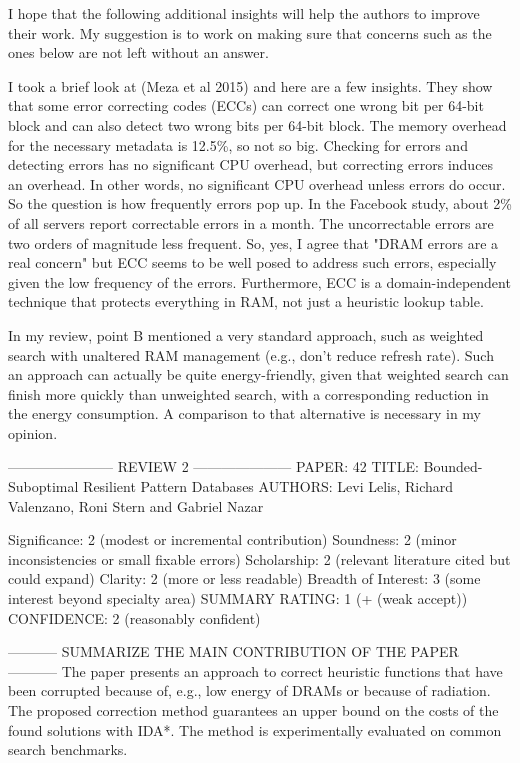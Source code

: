 I hope that the following additional insights will help the authors to improve their work. My suggestion is to work on making sure that concerns such as the ones below are not left without an answer.

I took a brief look at (Meza et al 2015) and here are a few insights. They show that some error correcting codes (ECCs) can correct one wrong bit per 64-bit block and can also detect two wrong bits per 64-bit block. The memory overhead for the necessary metadata is 12.5\%, so not so big. Checking for errors and detecting errors has no significant CPU overhead, but correcting errors induces an overhead. In other words, no significant CPU overhead unless errors do occur. So the question is how frequently errors pop up. In the Facebook study, about 2\% of all servers report correctable errors in a month. The uncorrectable errors are two orders of magnitude less frequent. So, yes, I agree that "DRAM errors are a real concern" but ECC seems to be well posed to address such errors, especially given the low frequency of the errors. Furthermore, ECC is a domain-independent technique that protects everything in RAM, not just a heuristic lookup table.

In my review, point B mentioned a very standard approach, such as weighted search with unaltered RAM management (e.g., don't reduce refresh rate). Such an approach can actually be quite energy-friendly, given that weighted search can finish more quickly than unweighted search, with a corresponding reduction in the energy consumption. A comparison to that alternative is necessary in my opinion.


----------------------- REVIEW 2 ---------------------
PAPER: 42
TITLE: Bounded-Suboptimal Resilient Pattern Databases
AUTHORS: Levi Lelis, Richard Valenzano, Roni Stern and Gabriel Nazar

Significance: 2 (modest or incremental contribution)
Soundness: 2 (minor inconsistencies or small fixable errors)
Scholarship: 2 (relevant literature cited but could expand)
Clarity: 2 (more or less readable)
Breadth of Interest: 3 (some interest beyond specialty area)
SUMMARY RATING: 1 (+ (weak accept))
CONFIDENCE: 2 (reasonably confident)

----------- SUMMARIZE THE MAIN CONTRIBUTION OF THE PAPER -----------
The paper presents an approach to correct heuristic functions that
have been corrupted because of, e.g., low energy of DRAMs or because
of radiation. The proposed correction method guarantees an upper bound
on the costs of the found solutions with IDA*. The method is
experimentally evaluated on common search benchmarks.

